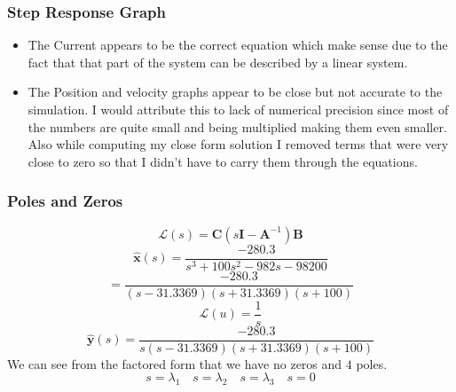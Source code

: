 \documentclass{beamer}
\begin{document}
\begin{frame}
\frametitle{Step Response Graph}
\begin{itemize}[$\bullet$]
	\item The Current appears to be the correct equation which make sense due to the fact that that part of the system can be described by a linear system.
	\item The Position and velocity graphs appear to be close but not accurate to the simulation. I would attribute this to lack of numerical precision since most of the numbers are quite small and being multiplied making them even smaller.
    Also while computing my close form solution I removed terms that were very close to zero so that I didn't have to carry them through the equations.
\end{itemize}

\end{frame}

\begin{frame}
\frametitle{Poles and Zeros}
$$\mathcal{L}(s) = \mathbf{C}(s\mathbf{I}-\mathbf{A}^{-1})\mathbf{B} $$
$$\mathbf{\hat{x}}(s) = \frac{-280.3}{s^3+100 s^2-982 s-98200} $$
$$ = \frac{-280.3}{(s-31.3369) (s+31.3369) (s+100)}$$
$$\mathcal{L}(u) = \frac{1}{s} $$
$$\mathbf{\hat{y}}(s) = \frac{-280.3}{s(s-31.3369) (s+31.3369) (s+100)}$$
We can see from the factored form that we have no zeros and $4$ poles.
$$ s = \lambda_1 \quad s = \lambda_2 \quad s = \lambda_3 \quad s = 0 $$
\end{frame}
\end{document}

